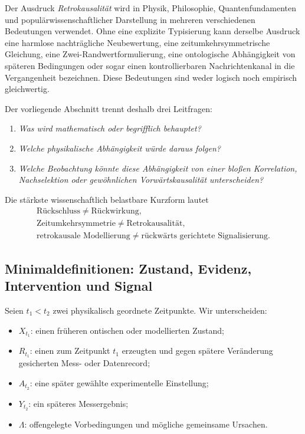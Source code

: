 \documentclass[11pt,a4paper]{article}
\theoremstyle{remark}
\begin{document}
Der Ausdruck \emph{Retrokausalität} wird in Physik, Philosophie,
Quantenfundamenten und populärwissenschaftlicher Darstellung in mehreren
verschiedenen Bedeutungen verwendet. Ohne eine explizite Typisierung kann
derselbe Ausdruck eine harmlose nachträgliche Neubewertung, eine
zeitumkehrsymmetrische Gleichung, eine Zwei-Randwertformulierung, eine
ontologische Abhängigkeit von späteren Bedingungen oder sogar einen
kontrollierbaren Nachrichtenkanal in die Vergangenheit bezeichnen. Diese
Bedeutungen sind weder logisch noch empirisch gleichwertig.

Der vorliegende Abschnitt trennt deshalb drei Leitfragen:
\begin{enumerate}
  \item \emph{Was wird mathematisch oder begrifflich behauptet?}
  \item \emph{Welche physikalische Abhängigkeit würde daraus folgen?}
  \item \emph{Welche Beobachtung könnte diese Abhängigkeit von einer bloßen
  Korrelation, Nachselektion oder gewöhnlichen Vorwärtskausalität
  unterscheiden?}
\end{enumerate}
Die stärkste wissenschaftlich belastbare Kurzform lautet
\[
\boxed{
\begin{gathered}
\text{Rückschluss}\neq\text{Rückwirkung},\\
\text{Zeitumkehrsymmetrie}\neq\text{Retrokausalität},\\
\text{retrokausale Modellierung}\neq
\text{rückwärts gerichtete Signalisierung}.
\end{gathered}}
\]

\subsection{Minimaldefinitionen: Zustand, Evidenz, Intervention und Signal}

Seien \(t_1<t_2\) zwei physikalisch geordnete Zeitpunkte. Wir unterscheiden:
\begin{itemize}
  \item \(X_{t_1}\): einen früheren ontischen oder modellierten Zustand;
  \item \(R_{t_1}\): einen zum Zeitpunkt \(t_1\) erzeugten und gegen spätere
  Veränderung gesicherten Mess- oder Datenrecord;
  \item \(A_{t_2}\): eine später gewählte experimentelle Einstellung;
  \item \(Y_{t_2}\): ein späteres Messergebnis;
  \item \(\Lambda\): offengelegte Vorbedingungen und mögliche gemeinsame
  Ursachen.
\end{itemize}
\end{document}
